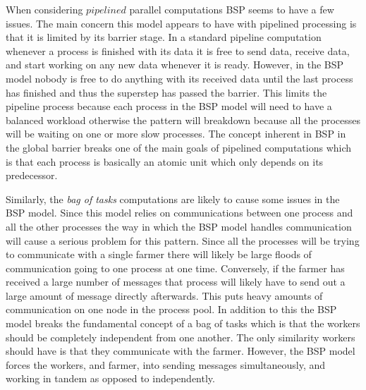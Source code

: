 \documentclass[10pt]{report}
\begin{document}
When considering $pipelined$ parallel computations BSP seems to have a
few issues. The main concern this model appears to have with
pipelined processing is that it is limited by its barrier stage. In
a standard pipeline computation whenever a process is finished with
its data it is free to send data, receive data, and start working on
any new data whenever it is ready. However, in
the BSP model nobody is free to do anything with its received data
until the last process has finished and thus the superstep has passed
the barrier. This limits the pipeline process because each
process in the BSP model will need to have a balanced workload
otherwise the pattern will breakdown because all the processes will be
waiting on one or more slow processes. The concept inherent in BSP in
the global barrier breaks one of the main goals of pipelined
computations which is that each process is basically an atomic unit
which only depends on its predecessor.

Similarly, the \emph{bag of tasks} computations are likely to cause
some issues in the BSP model. Since this model relies on
communications between one process and all the other processes the way
in which the BSP model handles communication will cause a serious
problem for this pattern. Since all the processes will be trying to
communicate with a single farmer there will likely be large floods of
communication going to one process at one time. Conversely, if the
farmer has received a large number of messages that process will
likely have to send out a large amount of message directly
afterwards. This puts heavy amounts of communication on one node in
the process pool. In addition to this the BSP model breaks the
fundamental concept of a bag of tasks which is that the workers should
be completely independent from one another. The only similarity
workers should have is that they communicate with the farmer. However,
the BSP model forces the workers, and farmer, into sending messages
simultaneously, and working in tandem as opposed to independently. 


{}

\end{document}
